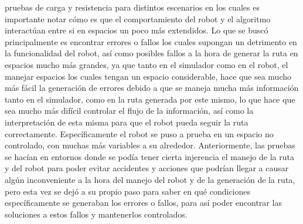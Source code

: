     pruebas de carga y resistencia para distintos escenarios en los cuales es importante notar
    c\'omo es que el comportamiento del robot y el algoritmo interact\'uan entre si en espacios un
    poco m\'as extendidos.
    \vskip 0.5cm
    Lo que se busc\'o principalmente es encontrar errores o fallos los cuales supongan un
    detrimento en la funcionalidad del robot, as\'i como posibles fallos a la hora de generar la ruta
    en espacios mucho m\'as grandes, ya que tanto en el simulador como en el robot, el manejar
    espacios los cuales tengan un espacio considerable, hace que sea mucho m\'as f\'acil la
    generaci\'on de errores debido a que se maneja mucha m\'as informaci\'on tanto en el simulador,
    como en la ruta generada por este mismo, lo que hace que sea mucho m\'as dif\'icil controlar el
    flujo de la informaci\'on, as\'i como la interpretaci\'on de esta misma para que el robot pueda
    seguir la ruta correctamente.
    \vskip 0.5cm
    Espec\'ificamente el robot se puso a prueba en un espacio no controlado, con muchas m\'as
    variables a su alrededor. Anteriormente, las pruebas se hac\'ian en entornos donde se pod\'ia
    tener cierta injerencia el manejo de la ruta y del robot para poder evitar accidentes y acciones
    que podr\'ian llegar a causar alg\'un inconveniente a la hora del manejo del robot y de la
    generaci\'on de la ruta, pero esta vez se dej\'o a su propio paso para saber en qu\'e condiciones
    espec\'ificamente se generaban los errores o fallos, para as\'i poder encontrar las soluciones a
    estos fallos y mantenerlos controlados.